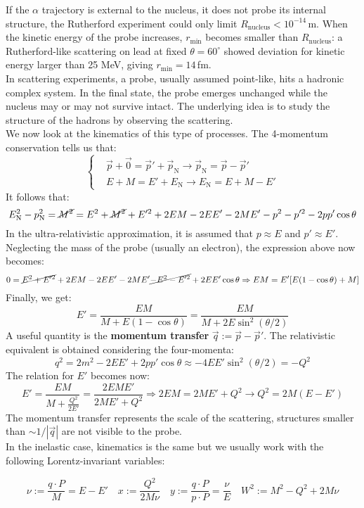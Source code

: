 \documentclass[10.75pt,a4paper,openright,bottom=2cm]{article}
\begin{document}
If the $\alpha$ trajectory is external to the nucleus, it does not probe its internal structure, the Rutherford experiment could only limit $R_{\text{nucleus}}<10^{-14}$\,m. When the kinetic energy of the probe increases, $r_{\min}$ becomes smaller than $R_{\text{nucleus}}$: a Rutherford-like scattering on lead at fixed $\theta=60^\circ$ showed deviation for kinetic energy larger than 25 MeV, giving $r_{\min}=14$\,fm.\\
In scattering experiments, a probe, usually assumed point-like, hits a hadronic complex system. In the final state, the probe emerges unchanged while the nucleus may or may not survive intact. The underlying idea is to study the structure of the hadrons by observing the scattering.\\
We now look at the kinematics of this type of processes. The 4-momentum conservation tells us that:
\[
\left\{
\begin{aligned}
&\Vec{p}+\Vec{0}=\Vec{p}'+\Vec{p}_{\text{N}}\to\Vec{p}_{\text{N}}=\Vec{p}-\Vec{p}'\\
&E+M=E'+E_{\text{N}}\to E_{\text{N}}=E+M-E'
\end{aligned}
\right.
\]
It follows that:
\[
E_{\text{N}}^2-p_{\text{N}}^2=\cancel{M^2}=E^2+\cancel{M^2}+E'^2+2EM-2EE'-2ME'-p^2-p'^2-2pp'\cos\theta
\]
In the ultra-relativistic approximation, it is assumed that $p\approx E$ and $p'\approx E'$. Neglecting the mass of the probe (usually an electron), the expression above now becomes:
\[
0=\cancel{E^2+E'^2}+2EM-2EE'-2ME'\cancel{-E^2-E'^2}+2EE'\cos\theta\Rightarrow EM=E'[E(1-\cos\theta)+M]
\]
Finally, we get:
\[
E'=\frac{EM}{M+E(1-\cos\theta)}=\frac{EM}{M+2E\sin^2(\theta/2)}
\]
A useful quantity is the \textbf{momentum transfer} $\Vec{q}:=\Vec{p}-\Vec{p}'$. The relativistic equivalent is obtained considering the four-momenta:
\[
q^2=2m^2-2EE'+2pp'\cos\theta\approx-4EE'\sin^2(\theta/2)=-Q^2
\]
The relation for $E'$ becomes now:
\[
E'=\frac{EM}{M+\frac{Q^2}{2E'}}=\frac{2EME'}{2ME'+Q^2}\Rightarrow 2EM=2ME'+Q^2\to Q^2=2M(E-E')
\]
The momentum transfer represents the scale of the scattering, structures smaller than $\sim1/|\Vec{q}|$ are not visible to the probe.\\
In the inelastic case, kinematics is the same but we usually work with the following Lorentz-invariant variables:
\begin{tcolorbox}[width=\textwidth,colback={yellow!50},title={Lorentz-Invariant Variables},colbacktitle={gray!50},coltitle=black]
\[
\nu:=\frac{q\cdot P}{M}=E-E' \quad x:=\frac{Q^2}{2M\nu} \quad y:=\frac{q\cdot P}{p\cdot P}=\frac{\nu}{E} \quad W^2:=M^2-Q^2+2M\nu
\]
\end{tcolorbox}
\end{document}
